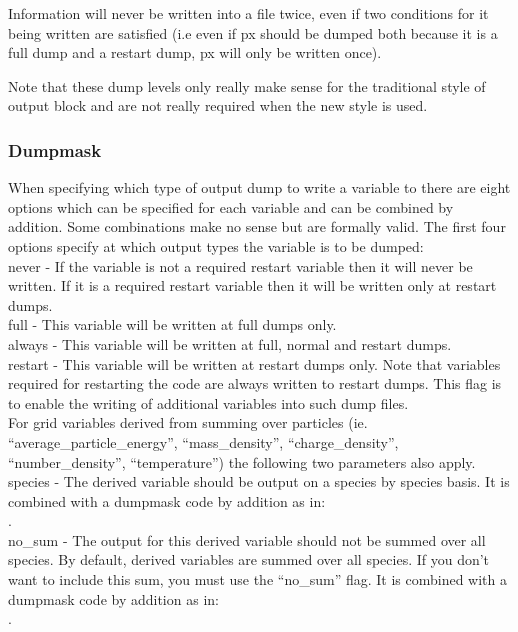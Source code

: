 Information will never be written into a file twice, even if two conditions for
it being written are satisfied (i.e even if px should be dumped both because it
is a full dump and a restart dump, px will only be written once).

Note that these dump levels only really make sense for the traditional style
of output block and are not really required when the new style is used.

\subsubsection{Dumpmask}
When specifying which type of output dump to write a variable to there are
eight options which can be specified for each variable and can be combined by
addition. Some combinations make no sense but are formally
valid. The first four options specify at which output types the variable
is to be dumped:\\

{\emphtext never} - If the variable is not a required restart variable then it
will never be written. If it is a required restart variable then it will be
written only at restart dumps.\\

{\emphtext full} - This variable will be written at full dumps only.\\

{\emphtext always} - This variable will be written at full, normal and restart
dumps.\\

{\emphtext restart} - This variable will be written at restart dumps only.
Note that variables required for restarting the code are always written to
restart dumps. This flag is to enable the writing of additional variables
into such dump files.\\

For grid variables derived from summing over particles
(ie. ``average\_particle\_energy'',
``mass\_density'', ``charge\_density'', ``number\_density'', ``temperature'')
the following two parameters also apply.\\

{\emphtext species} - The derived variable should be output on a
species by species basis. It is combined with a dumpmask code
by addition as in:\\
\indent{}.\\

{\emphtext no\_sum} - The output for this derived variable should not
be summed over all species. By default, derived variables are summed over
all species. If you don't want to include this sum, you must use
the ``no\_sum'' flag. It is combined with a dumpmask code
by addition as in:\\
\indent{}.\\


